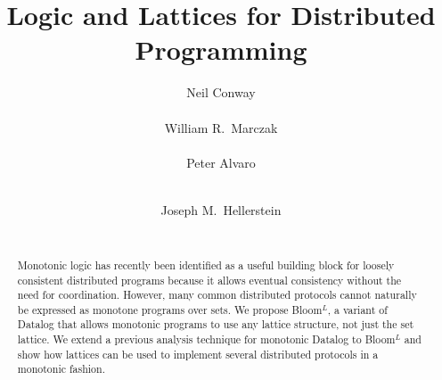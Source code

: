 \documentclass{vldb}
\def\lang{Bloom$^L$\xspace}
\begin{document}
\title{Logic and Lattices for Distributed Programming}


\author{
\alignauthor
Neil Conway\\
       \\
\alignauthor
William R.\ Marczak\\
       \\
\alignauthor
Peter Alvaro\\
       \\
\and
\alignauthor
Joseph M.\ Hellerstein\\
       \\
}

\maketitle

\begin{abstract}
  Monotonic logic has recently been identified as a useful building block for
  loosely consistent distributed programs because it allows eventual consistency
  without the need for coordination. However, many common distributed protocols
  cannot naturally be expressed as monotone programs over sets. We propose
  \lang, a variant of Datalog that allows monotonic programs to use any lattice
  structure, not just the set lattice. We extend a previous analysis technique
  for monotonic Datalog to \lang and show how lattices can be used to implement
  several distributed protocols in a monotonic fashion.
\end{abstract}










%




\newpage
\begin{appendix}

\end{appendix}
\end{document}
